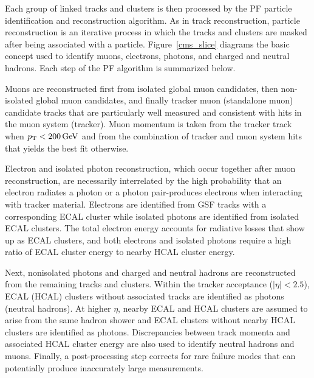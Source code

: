 Each group of linked tracks and clusters is then processed by the PF particle identification and reconstruction algorithm. As in track reconstruction, particle reconstruction is an iterative process in which the tracks and clusters are masked after being associated with a particle. Figure~\ref{cms_slice} diagrams the basic concept used to identify muons, electrons, photons, and charged and neutral hadrons. Each step of the PF algorithm is summarized below.

Muons are reconstructed first from isolated global muon candidates, then non-isolated global muon candidates, and finally tracker muon (standalone muon) candidate tracks that are particularly well measured and consistent with hits in the muon system (tracker). Muon momentum is taken from the tracker track when $\pt<\SI{200}{\GeV}$ and from the combination of tracker and muon system hits that yields the best fit otherwise.

Electron and isolated photon reconstruction, which occur together after muon reconstruction, are necessarily interrelated by the high probability that an electron radiates a photon or a photon pair-produces electrons when interacting with tracker material. Electrons are identified from GSF tracks with a corresponding ECAL cluster while isolated photons are identified from isolated ECAL clusters. The total electron energy accounts for radiative losses that show up as ECAL clusters, and both electrons and isolated photons require a high ratio of ECAL cluster energy to nearby HCAL cluster energy.

Next, nonisolated photons and charged and neutral hadrons are reconstructed from the remaining tracks and clusters. Within the tracker acceptance ($|\eta|<2.5$), ECAL (HCAL) clusters without associated tracks are identified as photons (neutral hadrons). At higher $\eta$, nearby ECAL and HCAL clusters are assumed to arise from the same hadron shower and ECAL clusters without nearby HCAL clusters are identified as photons. Discrepancies between track momenta and associated HCAL cluster energy are also used to identify neutral hadrons and muons. Finally, a post-processing step corrects for rare failure modes that can potentially produce inaccurately large \ptmiss measurements.



\pagebreak